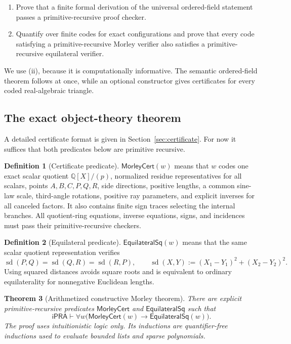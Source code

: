\documentclass[11pt]{article}
\newtheorem{theorem}{Theorem}[section]
\theoremstyle{definition}
\newtheorem{definition}[theorem]{Definition}
\newcommand{\iPRA}{\mathsf{iPRA}}
\newcommand{\Cert}{\mathsf{MorleyCert}}
\newcommand{\EqSq}{\mathsf{EquilateralSq}}
\newcommand{\Q}{\mathbb Q}
\newcommand{\sqdist}{\operatorname{sd}}
\begin{document}
\begin{enumerate}[label=(\roman*)]
\item Prove that a finite formal derivation of the universal ordered-field
statement passes a primitive-recursive proof checker.
\item Quantify over finite codes for exact configurations and prove that every
code satisfying a primitive-recursive Morley verifier also satisfies a
primitive-recursive equilateral verifier.
\end{enumerate}

We use (ii), because it is computationally informative.  The semantic
ordered-field theorem follows at once, while an optional constructor gives
certificates for every coded real-algebraic triangle.

\subsection{The exact object-theory theorem}
A detailed certificate format is given in Section~\ref{sec:certificate}.  For
now it suffices that both predicates below are primitive recursive.

\begin{definition}[Certificate predicate]
$\Cert(w)$ means that $w$ codes one exact scalar quotient
$\Q[X]/(p)$, normalized residue representatives for all scalars, points
$A,B,C,P,Q,R$, side directions, positive lengths, a common sine-law scale,
third-angle rotations, positive ray parameters, and explicit inverses for
all canceled factors.  It also contains finite sign traces selecting the
internal branches.  All quotient-ring equations, inverse equations, signs,
and incidences must pass their primitive-recursive checkers.
\end{definition}

\begin{definition}[Equilateral predicate]
$\EqSq(w)$ means that the same scalar quotient representation verifies
\[
 \sqdist(P,Q)=\sqdist(Q,R)=\sqdist(R,P),
 \qquad
 \sqdist(X,Y):=(X_1-Y_1)^2+(X_2-Y_2)^2.
\]
Using squared distances avoids square roots and is equivalent to ordinary
equilaterality for nonnegative Euclidean lengths.
\end{definition}

\begin{theorem}[Arithmetized constructive Morley theorem]
\label{thm:ipra-main}
There are explicit primitive-recursive predicates $\Cert$ and $\EqSq$ such
that
\[
  \boxed{\quad\iPRA\vdash
  \forall w\bigl(\Cert(w)\to\EqSq(w)\bigr).\quad}
\]
The proof uses intuitionistic logic only.  Its inductions are quantifier-free
inductions used to evaluate bounded lists and sparse polynomials.
\end{theorem}
\end{document}
